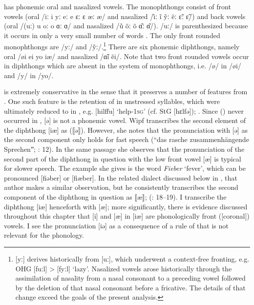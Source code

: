  has phonemic oral and nasalized vowels. The monophthongs consist of front vowels (oral /iː i yː eː e ɛː ɛ  æː æ/ and nasalized /{\~\i}ː \~i  ỹː ẽː  \~ɛː \~ɛ/) and back vowels (oral /(uː) u oː o ɑː ɑ/ and nasalized /\~u  õː õ ɑ͂ː ɑ͂/). /uː/ is parenthesized because it occurs in only a very small number of words \citep[11]{Wipf1910}. The only front rounded monophthongs are /yː/ and /ỹː/.\footnote{\label{fn:6:2}[yː] derives historically from  [uː], which underwent a context-free fronting, e.g. OHG [fuːl] > [fyːl] ‘lazy’. Nasalized vowels arose historically through the assimilation of nasality from a nasal consonant to a preceding vowel followed by the deletion of that nasal consonant before a fricative. The details of that change \citep[44--45]{Wipf1910} exceed the goals of the present analysis.} There are six phonemic diphthongs, namely oral /øi ei yo iæ/ and nasalized /\~ɑi ẽi/. Note that two front rounded vowels occur in diphthongs which are absent in the system of monophthongs, i.e. /ø/ in /øi/ and /y/ in /yo/.

 is extremely conservative in the sense that it preserves a number of features from . One such feature is the retention of  in unstressed syllables, which were ultimately reduced to  in , e.g. [hilffu] ‘help-\textsc{1sg}’ (cf. StG [hɛlfə]); \citet[146]{Wipf1910}. Since  ()  never occurred in , [ə] is not a phonemic vowel. Wipf transcribes the second element of the diphthong [iæ] as  (⟦ə⟧). However, she notes that the pronunciation with [ə] as the second component only holds for fast speech (“das rasche zusammenhängende Sprechenˮ; \citealt{Wipf1910}: 12). In the same passage she observes that the pronunciation of the second part of the diphthong in question with the low front vowel [æ] is typical for slower speech. The example she gives is the word \textit{Fieber} ‘fever’, which can be pronounced [fiəber] or [fiæber]. In the related dialect discussed below in  \citep{Brun1918}, that author makes a similar observation, but he consistently transcribes the second component of the diphthong in question as ⟦æ⟧; (\citealt{Brun1918}: 18--19). I transcribe the diphthong [iæ] henceforth with [æ]; more significantly, there is evidence discussed throughout this chapter that [i] and [æ] in [iæ] are phonologically front ([coronal]) vowels. I see the pronunciation [iə] as a consequence of a rule of  that is not relevant for the phonology.

